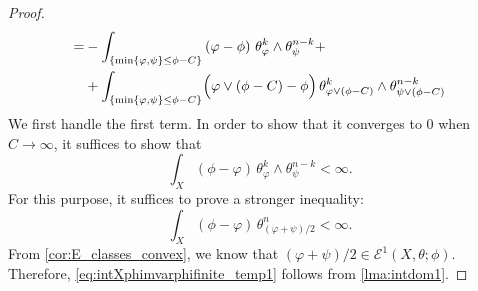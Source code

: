 \begin{proof}
\[\begin{aligned}
    =& -\int_{\{\min\{\varphi,\psi\}\leq \phi-C\}}\left( \varphi-\phi \right) \,\theta_{\varphi}^k\wedge \theta_{\psi}^{n-k}+\\
     &+\int_{\{\min\{\varphi,\psi\}\leq \phi-C\}}\Bigl( \varphi\lor (\phi-C)-\phi \Bigr) \,\theta_{\varphi\lor (\phi-C)}^k\wedge \theta_{\psi\lor (\phi-C)}^{n-k}
    \end{aligned}
    \]
    We first handle the first term. In order to show that it converges to $0$ when $C\to \infty$, it suffices to show that
    \[
    \int_X\left( \phi-\varphi \right) \,\theta_{\varphi}^k\wedge \theta_{\psi}^{n-k}<\infty.
    \]
    For this purpose, it suffices to prove a stronger inequality:
    \begin{equation}\label{eq:intXphimvarphifinite_temp1}
    \int_X\left( \phi-\varphi \right) \,\theta_{(\varphi+\psi)/2}^n<\infty.
    \end{equation}
    From \cref{cor:E_classes_convex}, we know that $(\varphi+\psi)/2\in \mathcal{E}^1(X,\theta;\phi)$. Therefore, \eqref{eq:intXphimvarphifinite_temp1} follows from \cref{lma:intdom1}.



\end{proof}
